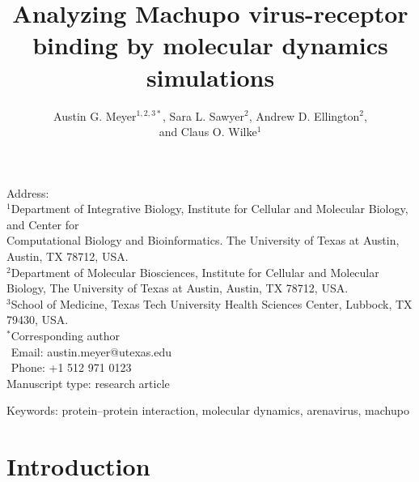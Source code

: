 \documentclass[12pt]{article}
\begin{document}
\title{\textbf{Analyzing Machupo virus-receptor binding by molecular dynamics simulations}}
\author{Austin G. Meyer$^{1,2,3*}$, Sara L. Sawyer$^{2}$, Andrew D. Ellington$^{2}$,\\and Claus O. Wilke$^{1}$}
\date{}

\maketitle
\noindent
Address:\\
$^1$Department of Integrative Biology, Institute for Cellular and Molecular
Biology, and Center for\\Computational Biology and Bioinformatics. The University
of Texas at Austin, Austin, TX 78712, USA.\\
$^2$Department of Molecular Biosciences, Institute for Cellular and Molecular 
Biology, The University of Texas at Austin, Austin, TX 78712, USA.\\
$^3$School of Medicine, Texas Tech University Health Sciences Center, 
Lubbock, TX 79430, USA.\\

\bigskip
\noindent
$^*$Corresponding author\\
$\phantom{^*}$Email: austin.meyer@utexas.edu\\
$\phantom{^*}$Phone: +1 512 971 0123\\

\bigskip
\noindent
Manuscript type: research article

\bigskip
\noindent Keywords: protein--protein interaction, molecular dynamics, arenavirus, machupo

\linenumbers
\newpage

\section{Introduction}
\end{document}
